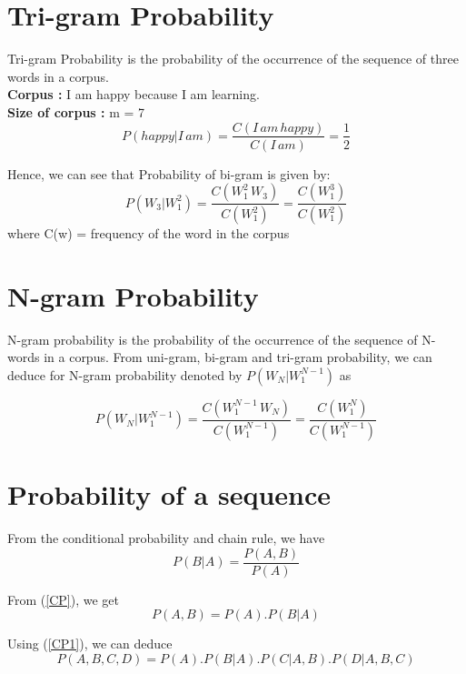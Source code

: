 \section{Tri-gram Probability}
Tri-gram Probability is the probability of the occurrence of the sequence of three words in a corpus.
\\
\textbf{Corpus :} I am happy because I am learning.
\\
\textbf{Size of corpus : } m = 7
\begin{equation}
	P(happy | I\, am) = \frac{C(I\, am \, happy)}{C(I \, am)} = \frac{1}{2}
\end{equation}

Hence, we can see that Probability of bi-gram is given by:
\begin{equation}
	P(W_3 | W_1^2) = \frac{C(W_1^2\, W_3)}{C(W_1^2)} = \frac{C(W_1^3)}{C(W_1^2)}
\end{equation}
where C(w) = frequency of the word in the corpus

\section{N-gram Probability}
N-gram probability is the probability of the occurrence of the sequence of N-words in a corpus. From uni-gram, bi-gram  and tri-gram probability, we can deduce for N-gram probability denoted by $P(W_N | W_1^{N-1})$ as

\begin{equation}
	P(W_N | W_1^{N-1}) = \frac{C(W_1^{N - 1} \, W_N)}{C(W_1^{N - 1})} = \frac{C(W_1^N)}{C(W_1^{N - 1})}
\end{equation}

\section{Probability of a sequence}
From the conditional probability and chain rule, we have
\begin{equation}\label{CP}
	P(B|A) = \frac{P(A, B)}{P(A)}
\end{equation}

From (\ref{CP}), we get
\begin{equation}\label{CP1}
	P(A, B) = P(A) . P(B | A)
\end{equation}

Using (\ref{CP1}), we can deduce
\begin{equation}
	P(A, B, C, D) = P(A).P(B|A).P(C|A, B).P(D|A, B, C)
\end{equation}

